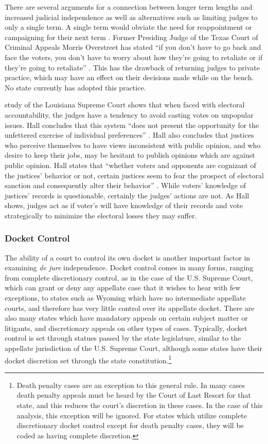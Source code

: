 \documentclass[12pt]{article}
\begin{document}
There are several arguments for a connection between longer term lengths and increased judicial independence as well as alternatives such as limiting judges to only a single term. A single term would obviate the need for reappointment or campaigning for their next term \citep{Carrington1998}.  Former Presiding Judge of the Texas Court of Criminal Appeals Morris Overstreet has stated ``if you don't have to go back and face the voters, you don't have to worry about how they're going to retaliate or if they're going to retaliate'' \citep{ABA2003}.  This has the drawback of returning judges to private practice, which may have an effect on their decisions made while on the bench.  No state currently has adopted this practice.

\citet{Hall1987} study of the Louisiana Supreme Court shows that when faced with electoral accountability, the judges have a tendency to avoid casting votes on unpopular issues. Hall concludes that this system ``does not present the opportunity for the unfettered exercise of individual preferences'' \citep[46]{Hall1987}.  Hall also concludes that justices who perceive themselves to have views inconsistent with public opinion,  and who desire to keep their jobs, may be hesitant to publish opinions which are against public opinion. Hall states that ``whether voters and opponents are cognizant of the justices’ behavior or not, certain justices seem to fear the prospect of electoral sanction and consequently alter their behavior'' \citep[1123]{Hall1987b}.  While voters’ knowledge of justices' records is questionable, certainly the judges' actions are not.  As Hall shows, judges act as if voter's will have knowledge of their records and vote strategically to minimize the electoral losses they may suffer.

\subsubsection*{Docket Control}
The ability of a court to control its own docket is another important factor in examining \textit{de jure} independence.  Docket control comes in many forms, ranging from complete discretionary control, as in the case of the U.S. Supreme Court, which can grant or deny any appellate case that it wishes to hear with few exceptions, to states such as Wyoming which have no intermediate appellate courts, and therefore has very little control over its appellate docket. There are also many states which have mandatory appeals on certain subject matter or litigants, and discretionary appeals on other types of cases.  Typically, docket control is set through statues passed by the state legislature, similar to the appellate jurisdiction of the U.S. Supreme Court, although some states have their docket discretion set through the state constitution.\footnote{Death penalty cases are an exception to this general rule.  In many cases death penalty appeals must be heard by the Court of Last Resort for that state, and this reduces the court's discretion in these cases.  In the case of this analysis, this exception will be ignored.  For states which utilize complete discretionary docket control except for death penalty cases, they will be coded as having complete discretion.}
\end{document}
